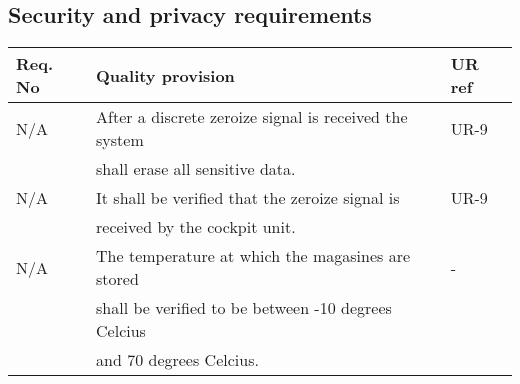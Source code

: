 \subsection{Security and privacy requirements}
\begin{center}
    \begin{tabular}{ | l | l | l |}
    \hline
    Req. No & Quality provision  									& UR ref \\ \hline
		N/A & After a discrete zeroize signal is received the system& UR-9 \\
			& shall erase all sensitive data. 						&\\ \hline
		N/A & It shall be verified that the zeroize signal is		& UR-9 \\
			& received by the cockpit unit.							&\\ \hline
		N/A & The temperature at which the magasines are stored		& - \\
			& shall be verified to be between -10 degrees Celcius 	&\\
			& and 70 degrees Celcius.								&\\ \hline
    \hline
    \end{tabular}
\end{center}
